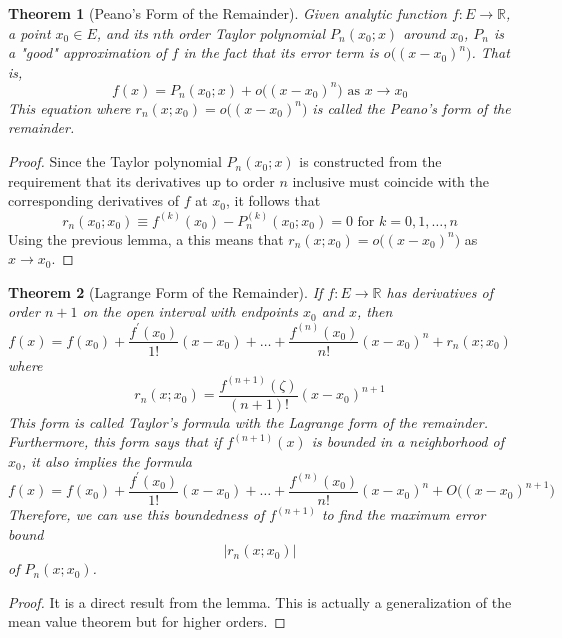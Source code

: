 \documentclass{article}
\newtheorem{theorem}{Theorem}[section]
\theoremstyle{remark}
\theoremstyle{definition}
\begin{document}
\begin{theorem}[Peano's Form of the Remainder]
Given analytic function $f: E \longrightarrow \mathbb{R}$, a point $x_0 \in E$, and its $n$th order Taylor polynomial $P_n (x_0; x)$ around $x_0$, $P_n$ is a "good" approximation of $f$ in the fact that its error term is $o\big((x - x_0)^n\big)$. That is, 
\[f(x) = P_n (x_0; x) + o\big((x - x_0)^n \big) \text{ as } x \rightarrow x_0\]
This equation where $r_n (x; x_0) = o\big((x - x_0)^n\big)$ is called the \textit{Peano's form of the remainder}. 
\end{theorem}
\begin{proof}
Since the Taylor polynomial $P_n (x_0; x)$ is constructed from the requirement that its derivatives up to order $n$ inclusive must coincide with the corresponding derivatives of $f$ at $x_0$, it follows that
\[r_n (x_0; x_0) \equiv f^{(k)} (x_0) - P_n^{(k)} (x_0; x_0) = 0 \text{ for } k = 0, 1, \ldots, n\]
Using the previous lemma, a this means that $r_n (x; x_0) = o\big((x - x_0)^n\big)$ as $x \rightarrow x_0$. 
\end{proof}

\begin{theorem}[Lagrange Form of the Remainder]
If $f: E \longrightarrow \mathbb{R}$ has derivatives of order $n+1$ on the open interval with endpoints $x_0$ and $x$, then 
\[f(x) = f(x_0) + \frac{f^\prime (x_0)}{1!} (x - x_0) + \ldots + \frac{f^{(n)}(x_0)}{n!} (x - x_0)^n + r_n (x; x_0)\]
where 
\[r_n (x; x_0) = \frac{f^{(n+1)} (\zeta)}{(n+1)!} (x - x_0)^{n+1}\]
This form is called \textit{Taylor's formula with the Lagrange form of the remainder}. Furthermore, this form says that if $f^{(n+1)} (x)$ is bounded in a neighborhood of $x_0$, it also implies the formula
\[f(x) = f(x_0) + \frac{f^\prime (x_0)}{1!} (x - x_0) + \ldots + \frac{f^{(n)} (x_0)}{n!} (x - x_0)^n + O\big( (x - x_0)^{n+1} \big)\]
Therefore, we can use this boundedness of $f^{(n+1)}$ to find the maximum error bound 
\[|r_n (x; x_0)|\]
of $P_n (x; x_0)$. 
\end{theorem}
\begin{proof}
It is a direct result from the lemma. This is actually a generalization of the mean value theorem but for higher orders. 
\end{proof}
\end{document}
